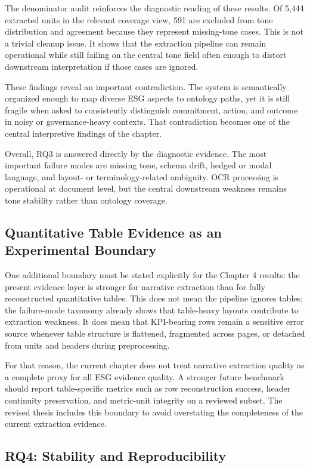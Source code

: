 \documentclass[english, online, cse, master]{dithesis}
\begin{document}
The denominator audit reinforces the diagnostic reading of these results. Of 5,444 extracted units in the relevant coverage view, 591 are excluded from tone distribution and agreement because they represent missing-tone cases. This is not a trivial cleanup issue. It shows that the extraction pipeline can remain operational while still failing on the central tone field often enough to distort downstream interpretation if those cases are ignored.

These findings reveal an important contradiction. The system is semantically organized enough to map diverse ESG aspects to ontology paths, yet it is still fragile when asked to consistently distinguish commitment, action, and outcome in noisy or governance-heavy contexts. That contradiction becomes one of the central interpretive findings of the chapter.

Overall, RQ3 is answered directly by the diagnostic evidence. The most important failure modes are missing tone, schema drift, hedged or modal language, and layout- or terminology-related ambiguity. OCR processing is operational at document level, but the central downstream weakness remains tone stability rather than ontology coverage.

\subsection{Quantitative Table Evidence as an Experimental Boundary}

One additional boundary must be stated explicitly for the Chapter 4 results: the present evidence layer is stronger for narrative extraction than for fully reconstructed quantitative tables. This does not mean the pipeline ignores tables; the failure-mode taxonomy already shows that table-heavy layouts contribute to extraction weakness. It does mean that KPI-bearing rows remain a sensitive error source whenever table structure is flattened, fragmented across pages, or detached from units and headers during preprocessing.

For that reason, the current chapter does not treat narrative extraction quality as a complete proxy for all ESG evidence quality. A stronger future benchmark should report table-specific metrics such as row reconstruction success, header continuity preservation, and metric-unit integrity on a reviewed subset. The revised thesis includes this boundary to avoid overstating the completeness of the current extraction evidence.

\subsection{RQ4: Stability and Reproducibility}
\end{document}
